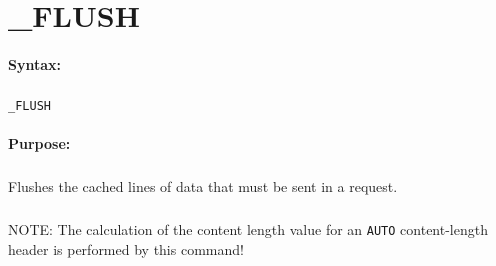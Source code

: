 
\newpage
\section{\_FLUSH}
\label{cmd:_FLUSH}

\paragraph{Syntax:}
\subparagraph{}
\texttt{\_FLUSH}

\paragraph{Purpose:}
\subparagraph{}
Flushes the cached lines of data that must be sent in a 
request.

\subparagraph{}
NOTE: The calculation of the content length value for an 
\texttt{AUTO} content-length header is performed by this command!